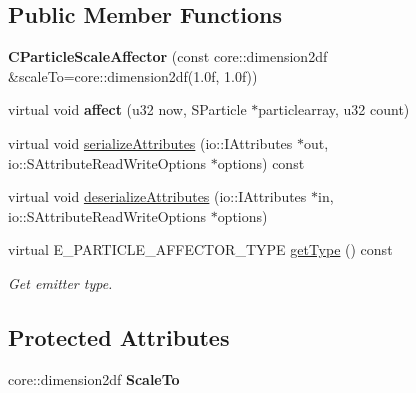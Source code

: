 \subsection*{Public Member Functions}
\begin{DoxyCompactItemize}
\item 
\hypertarget{classirr_1_1scene_1_1_c_particle_scale_affector_a19d8ef5f509cb6e7278601ba46f99f1b}{{\bfseries C\-Particle\-Scale\-Affector} (const core\-::dimension2df \&scale\-To=core\-::dimension2df(1.\-0f, 1.\-0f))}\label{classirr_1_1scene_1_1_c_particle_scale_affector_a19d8ef5f509cb6e7278601ba46f99f1b}

\item 
\hypertarget{classirr_1_1scene_1_1_c_particle_scale_affector_a8060aec25c8a61d3ecae20a555e6b726}{virtual void {\bfseries affect} (u32 now, S\-Particle $\ast$particlearray, u32 count)}\label{classirr_1_1scene_1_1_c_particle_scale_affector_a8060aec25c8a61d3ecae20a555e6b726}

\item 
virtual void \hyperlink{classirr_1_1scene_1_1_c_particle_scale_affector_a2e737358e5ef98df64aca543921159f0}{serialize\-Attributes} (io\-::\-I\-Attributes $\ast$out, io\-::\-S\-Attribute\-Read\-Write\-Options $\ast$options) const 
\item 
virtual void \hyperlink{classirr_1_1scene_1_1_c_particle_scale_affector_a07858df356d58eef06fb6f8b0edc0c54}{deserialize\-Attributes} (io\-::\-I\-Attributes $\ast$in, io\-::\-S\-Attribute\-Read\-Write\-Options $\ast$options)
\item 
\hypertarget{classirr_1_1scene_1_1_c_particle_scale_affector_aa818a4216aee9f4644d3c5bdeb85a325}{virtual E\-\_\-\-P\-A\-R\-T\-I\-C\-L\-E\-\_\-\-A\-F\-F\-E\-C\-T\-O\-R\-\_\-\-T\-Y\-P\-E \hyperlink{classirr_1_1scene_1_1_c_particle_scale_affector_aa818a4216aee9f4644d3c5bdeb85a325}{get\-Type} () const }\label{classirr_1_1scene_1_1_c_particle_scale_affector_aa818a4216aee9f4644d3c5bdeb85a325}

\begin{DoxyCompactList}\small\item\em Get emitter type. \end{DoxyCompactList}\end{DoxyCompactItemize}
\subsection*{Protected Attributes}
\begin{DoxyCompactItemize}
\item 
\hypertarget{classirr_1_1scene_1_1_c_particle_scale_affector_a0aed925754474b40eb3007176b33d0e4}{core\-::dimension2df {\bfseries Scale\-To}}\label{classirr_1_1scene_1_1_c_particle_scale_affector_a0aed925754474b40eb3007176b33d0e4}

\end{DoxyCompactItemize}


